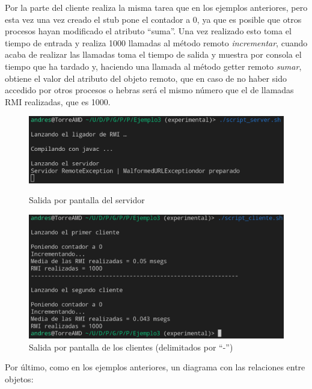 \documentclass{article}
\begin{document}
\bigskip

Por la parte del cliente realiza la misma tarea que en los ejemplos anteriores, pero esta vez una vez creado el stub pone el contador a 0, ya que es posible que otros procesos hayan modificado el atributo ``suma''. Una vez realizado esto toma el tiempo de entrada y realiza 1000 llamadas al método remoto \textit{incrementar}, cuando acaba de realizar las llamadas toma el tiempo de salida y muestra por consola el tiempo que ha tardado y, haciendo una llamada al método getter remoto \textit{sumar}, obtiene el valor del atributo del objeto remoto, que en caso de no haber sido accedido por otros procesos o hebras será el mismo número que el de llamadas RMI realizadas, que es 1000.

\begin{figure}[H]
    \centering
    \begin{minipage}[H]{0.49\textwidth}
        \centering
        \includegraphics[width=\textwidth]{imagenes/E3S1.png}
        \caption{Salida por pantalla del servidor}
    \end{minipage}
    \hfill
    \begin{minipage}[H]{0.49\textwidth}
        \centering
        \includegraphics[width=\textwidth]{imagenes/E3C1.png}
        \caption{Salida por pantalla de los clientes (delimitados por ``-'')}
    \end{minipage}
\end{figure}

Por último, como en los ejemplos anteriores, un diagrama con las relaciones entre objetos:
\end{document}
